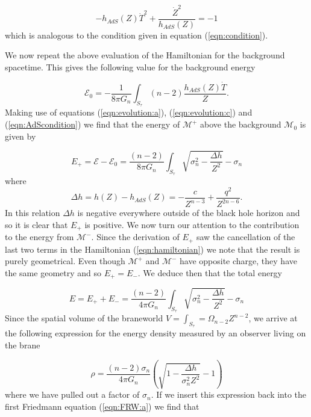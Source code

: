 \documentclass[a4paper,12pt]{article}
\begin{document}
\begin{equation} \label{eqn:AdScondition}
-h_{AdS}(Z)\dot{T}^2+\frac{\dot{Z}^2}{h_{AdS}(Z)}=-1
\end{equation} 
which is analogous to the condition given in equation
(\ref{eqn:condition}).

We now repeat the above evaluation of the Hamiltonian for the
background spacetime. This gives the following value for the
background energy

\begin{equation}
\mathcal{E}_0= -\frac{1}{8 \pi G_n} \int_{S_{\tau}}
(n-2)\frac{h_{AdS}(Z) \dot{T}}{Z}.
\end{equation}
Making use of equations (\ref{eqn:evolution:a}),
(\ref{eqn:evolution:c}) and (\ref{eqn:AdScondition}) we find that the
energy of $\mathcal{M}^+$ above the background $\mathcal{M}_0$ is
given by

\begin{equation}
E_+=\mathcal{E}-\mathcal{E}_0=\frac{(n-2)}{8 \pi G_n} \int_{S_{\tau}}
\sqrt{\sigma_n^2-\frac{\Delta h}{Z^2}} -\sigma_n
\end{equation}
where
\begin{equation}
\Delta h=h(Z)-h_{AdS}(Z)=-\frac{c}{Z^{n-3}}+\frac{q^2}{Z^{2n-6}}.
\end{equation}
In this relation $\Delta h$ is negative everywhere outside of the
black hole horizon and so it is clear that $E_+$ is positive.  We now
turn our attention to the contribution to the energy from
$\mathcal{M}^-$. Since the derivation of $E_+$ saw the cancellation of
the last two terms in the Hamiltonian (\ref{eqn:hamiltonian}) we note
that the result is purely geometrical. Even though $\mathcal{M}^+$ and
$\mathcal{M}^-$ have opposite charge, they have the same geometry and
so $E_+=E_-$. We deduce then that the total energy

\begin{equation} \label{eqn:energy}
E=E_++E_-= \frac{(n-2)}{4 \pi G_n} \int_{S_{\tau}}
\sqrt{\sigma_n^2-\frac{\Delta h}{Z^2}} -\sigma_n
\end{equation}
Since the spatial volume of the braneworld
$V=\int_{S_{\tau}}=\Omega_{n-2}Z^{n-2}$, we arrive at the following
expression for the energy density measured by an observer living on
the brane

\begin{equation} \label{eqn:rho}
\rho= \frac{(n-2)\sigma_n}{4 \pi G_n} \left( \sqrt{1-\frac{\Delta
h}{\sigma_n^2Z^2}} -1 \right)
\end{equation}
where we have pulled out a factor of $\sigma_n$. If we insert this
expression back into the first Friedmann equation (\ref{eqn:FRW:a}) we
find that
\end{document}
